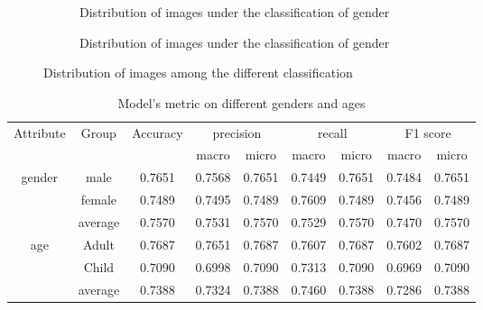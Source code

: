 \documentclass[]{report}
\begin{document}
\begin{figure}[h]
	\centering
	\begin{subfigure}{0.48\linewidth}
		\centering
		
		\caption{Distribution of images under the classification of gender}
		\label{fig:gender}
	\end{subfigure}
	\begin{subfigure}{0.48\linewidth}
		\centering
		
		\caption{Distribution of images under the classification of gender}
		\label{fig:age}
	\end{subfigure}
\caption{Distribution of images among the different classification}
\label{fig:bias}
\end{figure}


\begin{table}[]
	\centering
	\caption{Model's metric on different genders and ages}
	\begin{tabular}{|c|c|c|cc|cc|cc|}
		\hline
		\multirow{2}{*}{Attribute} &
		\multirow{2}{*}{Group} &
		\multirow{2}{*}{Accuracy} &
		\multicolumn{2}{c|}{precision} &
		\multicolumn{2}{c|}{recall} &
		\multicolumn{2}{c|}{F1 score} \\ \cline{4-9} 
		&         &        & \multicolumn{1}{c|}{macro}  & micro  & \multicolumn{1}{c|}{macro}  & micro  & \multicolumn{1}{c|}{macro}  & micro  \\ \hline
		\multirow{3}{*}{gender} & male    & 0.7651 & \multicolumn{1}{c|}{0.7568} & 0.7651 & \multicolumn{1}{c|}{0.7449} & 0.7651 & \multicolumn{1}{c|}{0.7484} & 0.7651 \\ \cline{2-9} 
		& female  & 0.7489 & \multicolumn{1}{c|}{0.7495} & 0.7489 & \multicolumn{1}{c|}{0.7609} & 0.7489 & \multicolumn{1}{c|}{0.7456} & 0.7489 \\ \cline{2-9} 
		& average & 0.7570 & \multicolumn{1}{c|}{0.7531} & 0.7570 & \multicolumn{1}{c|}{0.7529} & 0.7570 & \multicolumn{1}{c|}{0.7470} & 0.7570 \\ \hline \hline
		\multirow{3}{*}{age}    & Adult   & 0.7687 & \multicolumn{1}{c|}{0.7651} & 0.7687 & \multicolumn{1}{c|}{0.7607} & 0.7687 & \multicolumn{1}{c|}{0.7602} & 0.7687 \\ \cline{2-9} 
		& Child   & 0.7090 & \multicolumn{1}{c|}{0.6998} & 0.7090 & \multicolumn{1}{c|}{0.7313} & 0.7090 & \multicolumn{1}{c|}{0.6969} & 0.7090 \\ \cline{2-9} 
		& average & 0.7388 & \multicolumn{1}{c|}{0.7324} & 0.7388 & \multicolumn{1}{c|}{0.7460} & 0.7388 & \multicolumn{1}{c|}{0.7286} & 0.7388 \\ \hline
	\end{tabular}
	\label{tab:bias}
\end{table}
\end{document}
